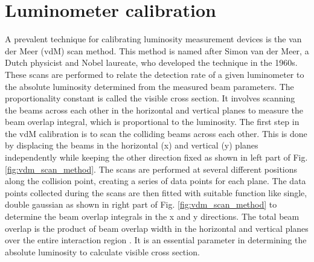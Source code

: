 \chapter{Luminometer calibration}  %

\ifpdf
    \graphicspath{{Chapter3/Figs/Raster/}{Chapter3/Figs/PDF/}{Chapter3/Figs/}}
\else
    \graphicspath{{Chapter3/Figs/Vector/}{Chapter3/Figs/}}
\fi


A prevalent technique for calibrating luminosity measurement devices is the van der Meer (vdM) scan method. This method is named after Simon van der Meer, a Dutch physicist and Nobel laureate, who developed the technique in the 1960s. These scans are performed to relate the detection rate of a given luminometer to the absolute luminosity determined from the measured beam parameters. The proportionality constant is called the visible cross section. It involves scanning the beams across each other in the horizontal and vertical planes to measure the beam overlap integral, which is proportional to the luminosity. The first step in the vdM calibration is to scan the colliding beams across each other. This is done by displacing the beams in the horizontal (x) and vertical (y) planes independently while keeping the other direction fixed as shown in left part of Fig. \ref{fig:vdm_scan_method}. The scans are performed at several different positions along the collision point, creating a series of data points for each plane. The data points collected during the scans are then fitted with  suitable function like single, double gaussian as shown in right part of Fig. \ref{fig:vdm_scan_method}  to determine the beam overlap integrals in the x and y directions. %
The total beam overlap is the product of beam overlap width in the horizontal and vertical planes over the entire interaction region \cite{vanderMeer1968}. It is an essential parameter in determining the absolute luminosity to calculate visible cross section. 



